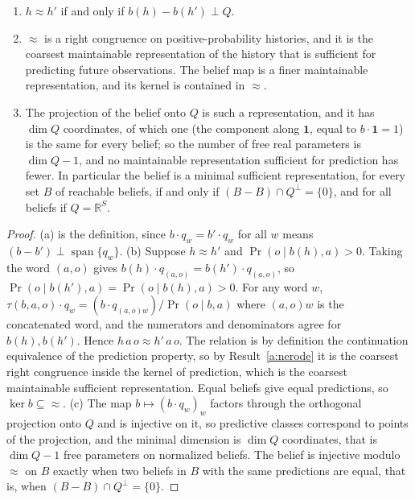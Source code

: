 \begin{newresult}\label{thm:predictive}
\begin{enumerate}[nosep,label=(\alph*)]
  \item $h\approx h'$ if and only if $b(h)-b(h')\perp Q$.
  \item $\approx$ is a right congruence on positive-probability histories, and it is the coarsest maintainable representation of the history that is sufficient for predicting future observations. The belief map is a finer maintainable representation, and its kernel is contained in $\approx$.
  \item The projection of the belief onto $Q$ is such a representation, and it has $\dim Q$ coordinates, of which one (the component along $\mathbf 1$, equal to $b\cdot\mathbf 1=1$) is the same for every belief; so the number of free real parameters is $\dim Q-1$, and no maintainable representation sufficient for prediction has fewer. In particular the belief is a minimal sufficient representation, for every set $B$ of reachable beliefs, if and only if $(B-B)\cap Q^{\perp}=\{0\}$, and for all beliefs if $Q=\mathbb R^{S}$.
\end{enumerate}
\end{newresult}
\begin{proof}
(a) is the definition, since $b\cdot q_w=b'\cdot q_w$ for all $w$ means $(b-b')\perp\operatorname{span}\{q_w\}$. (b) Suppose $h\approx h'$ and $\Pr(o\mid b(h),a)>0$. Taking the word $(a,o)$ gives $b(h)\cdot q_{(a,o)}=b(h')\cdot q_{(a,o)}$, so $\Pr(o\mid b(h'),a)=\Pr(o\mid b(h),a)>0$. For any word $w$, $\tau(b,a,o)\cdot q_w=(b\cdot q_{(a,o)w})/\Pr(o\mid b,a)$ where $(a,o)w$ is the concatenated word, and the numerators and denominators agree for $b(h),b(h')$. Hence $h\,a\,o\approx h'\,a\,o$. The relation is by definition the continuation equivalence of the prediction property, so by Result~\ref{a:nerode} it is the coarsest right congruence inside the kernel of prediction, which is the coarsest maintainable sufficient representation. Equal beliefs give equal predictions, so $\ker b\subseteq{\approx}$. (c) The map $b\mapsto(b\cdot q_w)_w$ factors through the orthogonal projection onto $Q$ and is injective on it, so predictive classes correspond to points of the projection, and the minimal dimension is $\dim Q$ coordinates, that is $\dim Q-1$ free parameters on normalized beliefs. The belief is injective modulo $\approx$ on $B$ exactly when two beliefs in $B$ with the same predictions are equal, that is, when $(B-B)\cap Q^{\perp}=\{0\}$.
\end{proof}


